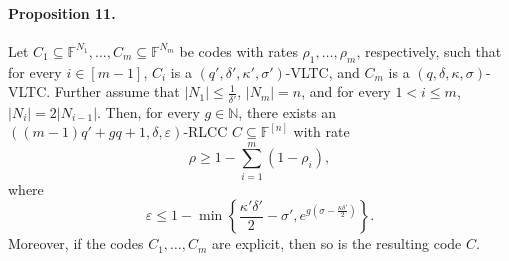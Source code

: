 \paragraph{Proposition 11.} Let $C_1\subseteq\mathbb F^{N_1},\ldots,C_m\subseteq\mathbb F^{N_m}$ be codes with rates $\rho_1,\ldots,\rho_m$, respectively, such that for every $i\in[m-1]$, $C_i$ is a $(q',\delta',\kappa',\sigma')$-VLTC, and $C_m$ is a $(q,\delta,\kappa,\sigma)$-VLTC. Further assume that $|N_1|\le\frac1{\delta'}$, $|N_m|=n$, and for every $1<i\le m$, $|N_i|=2|N_{i-1}|$. Then, for every $g\in\mathbb N$, there exists an $((m-1)q'+gq+1,\delta,\varepsilon)$-RLCC $C\subseteq\mathbb F^{[n]}$ with rate
\[\rho\ge1-\sum_{i=1}^m(1-\rho_i),\]
where
\[\varepsilon\le1-\min\left\{\frac{\kappa'\delta'}2-\sigma',e^{g(\sigma-\frac{\kappa\delta'}2)}\right\}.\]
Moreover, if the codes $C_1,\ldots,C_m$ are explicit, then so is the resulting code $C$.

